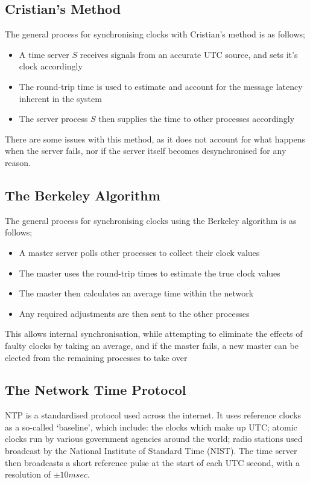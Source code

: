 \subsection*{Cristian's Method}

The general process for synchronising clocks with Cristian's method is as follows;
\begin{itemize}
  \item A time server $S$ receives signals from an accurate UTC source, and sets it's clock accordingly
  \item The round-trip time is used to estimate and account for the message latency inherent in the system
  \item The server process $S$ then supplies the time to other processes accordingly
\end{itemize}

There are some issues with this method, as it does not account for what happens when the server fails, nor if the server itself becomes desynchronised for any reason.

\subsection*{The Berkeley Algorithm}

The general process for synchronising clocks using the Berkeley algorithm is as follows;
\begin{itemize}
  \item A master server polls other processes to collect their clock values
  \item The master uses the round-trip times to estimate the true clock values
  \item The master then calculates an average time within the network
  \item Any required adjustments are then sent to the other processes
\end{itemize}

This allows internal synchronisation, while attempting to eliminate the effects of faulty clocks by taking an average, and if the master fails, a new master can be elected from the remaining processes to take over

\subsection*{The Network Time Protocol}

NTP is a standardised protocol used across the internet. It uses reference clocks as a so-called `baseline', which include: the clocks which make up UTC; atomic clocks run by various government agencies around the world; radio stations used broadcast by the National Institute of Standard Time (NIST). The time server then broadcasts a short reference pulse at the start of each UTC second, with a resolution of $\pm 10msec$.

